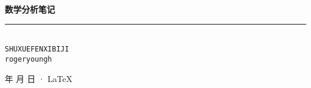 \documentclass[cn,11pt,blue,normal,founder]{elegantbook}
\begin{document}
\newcommand\mfrac[2]{\dfrac{#1\smash[b]{\strut}}{#2\smash[t]{\strut}}}
\newcommand\RR{\mathbb{R}}
\newcommand\NN{\mathbb{N}}
\newcommand\QQ{\mathbb{Q}}
\newcommand\ee{\mathrm{e}}
\newcommand\dd{\mathrm{d}}
\newcommand\uppi{\mathrm{\pi}}

\begin{titlepage}
    \vspace*{25ex}%
    \begin{minipage}{.9\textwidth}
    \flushright
        {\textbf{数学分析笔记}}\\%
        \rule{\linewidth}{1pt}\\ \vspace{2ex}
        {\texttt{SHUXUEFENXIBIJI}} \\%
        \vspace{20ex}%
        {\texttt{rogeryoungh}}%
    \end{minipage}
    \vfill\centering
    {\number\year 年 \number\month 月 \number\day 日 · \LaTeX{}}
\end{titlepage}
\clearpage{\hypersetup{hidelinks}\tableofcontents}

\clearpage

\end{document}
